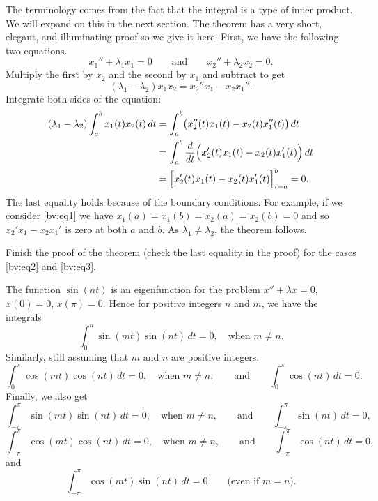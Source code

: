 The terminology comes from the fact that the integral is a type of
inner product.  We will expand on this in the next section.  The theorem
has a very short, elegant, and illuminating proof so we give it here.
First, we have the following two equations.
\begin{equation*}
x_1'' + \lambda_1 x_1 = 0
\qquad \text{and} \qquad
x_2'' + \lambda_2 x_2 = 0.
\end{equation*}
Multiply the first by $x_2$ and the second by $x_1$ and subtract to get
\begin{equation*}
(\lambda_1 - \lambda_2) x_1 x_2 = x_2'' x_1 - x_2 x_1'' .
\end{equation*}
Integrate both sides of the equation:
\begin{equation*}
\begin{split}
(\lambda_1 - \lambda_2) \int_a^b x_1(t) x_2(t) \,dt
& =
\int_a^b \bigl( x_2''(t) x_1(t) - x_2(t) x_1''(t) \bigr) \,dt \\
& =
\int_a^b \frac{d}{dt} \Bigl( x_2'(t) x_1(t) - x_2(t) x_1'(t) \Bigr) \,dt \\
& =
\Bigl[ x_2'(t) x_1(t) - x_2(t) x_1'(t) \Bigr]_{t=a}^b
= 0 .
\end{split}
\end{equation*}
The last equality holds because of the boundary conditions.  For example, if
we consider \eqref{bv:eq1} we have $x_1(a) = x_1(b) = x_2(a) = x_2(b) = 0$
and so $x_2' x_1 - x_2 x_1'$ is zero at both $a$ and $b$.
As $\lambda_1 \neq \lambda_2$, the theorem follows.

\begin{exercise}[easy]
Finish the proof of the theorem (check the last equality in the proof) for the cases
\eqref{bv:eq2} and \eqref{bv:eq3}.
\end{exercise}

The function $\sin (n t)$ is an eigenfunction for the problem
$x''+\lambda x = 0$, $x(0) = 0$, $x(\pi) = 0$. 
Hence for positive
integers $n$ and $m$, we have the integrals
\begin{equation*}
\int_{0}^\pi \sin (mt) \sin (nt) \,dt = 0 ,
\quad
\text{when } m \neq n.
\end{equation*}
Similarly, still assuming that $m$ and $n$ are positive
integers,
\begin{equation*}
\int_{0}^\pi \cos (mt) \cos (nt) \,dt = 0 ,
\quad
\text{when } m \neq n,
\qquad \text{and} \qquad
\int_{0}^\pi  \cos (nt) \,dt = 0 .
\end{equation*}
Finally, we also get
\begin{equation*}
\int_{-\pi}^\pi \sin (mt) \sin (nt) \,dt = 0 ,
\quad
\text{when } m \neq n, 
\qquad \text{and} \qquad
\int_{-\pi}^\pi  \sin (nt) \,dt = 0 ,
\end{equation*}
\begin{equation*}
\int_{-\pi}^\pi \cos (mt) \cos (nt) \,dt = 0 ,
\quad
\text{when } m \neq n,
\qquad \text{and} \qquad
\int_{-\pi}^\pi  \cos (nt) \,dt = 0 ,
\end{equation*}
and
\begin{equation*}
\int_{-\pi}^\pi \cos (mt) \sin (nt) \,dt = 0 
\qquad \text{(even if $m=n$).}
\end{equation*}

